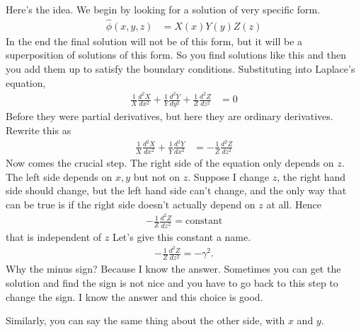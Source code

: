 Here's the idea.
We begin by looking for a solution
of very specific form.
\begin{align}
    \hat{\phi}\left( x, y, z \right)
    &=
    X(x) Y(y) Z(z)
\end{align}
In the end the final solution will not be of this form,
but it will be a superposition of solutions of this form.
So you find solutions like this and then you add them up to satisfy the boundary
conditions.
Substituting into Laplace's equation,
\begin{align}
    \frac{1}{X}\frac{d^2 X}{d x^2}
    +
    \frac{1}{Y}\frac{d^2 Y}{d y^2}
    +
    \frac{1}{Z}\frac{d^2 Z}{d z^2}
    &=
    0
\end{align}
Before they were partial derivatives,
but here they are ordinary derivatives.
Rewrite this as
\begin{align}
    \frac{1}{X} \frac{d^2 X}{dx^2}
    + \frac{1}{Y} \frac{d^2 Y}{dx^2}
    &=
    -\frac{1}{Z}
    \frac{d^2 Z}{dz^2}
\end{align}
Now comes the crucial step.
The right side of the equation only depends on $z$.
The left side depends on $x,y$ but not on $z$.
Suppose I change $z$,
the right hand side should change,
but the left hand side can't change,
and the only way that can be true is if the right side doesn't actually depend
on $z$ at all.
Hence
\begin{align}
    -\frac{1}{Z}
    \frac{d^2 Z}{dz^2}
    =
    \text{constant}
\end{align}
that is independent of $z$
Let's give this constant a name.
\begin{align}
    -\frac{1}{Z}
    \frac{d^2 Z}{dz^2}
    =
    -\gamma^2.
\end{align}
Why the minus sign?
Because I know the answer.
Sometimes you can get the solution and find the sign is not nice and you have to
go back to this step to change the sign.
I know the answer and this choice is good.

Similarly,
you can say the same thing about the other side,
with $x$ and $y$.

